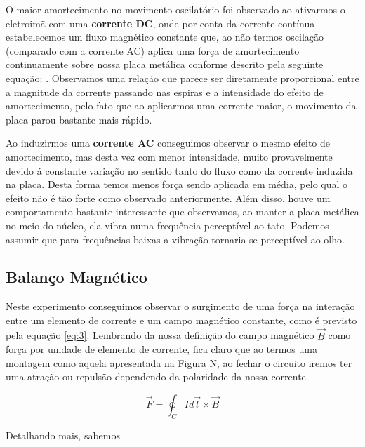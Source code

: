 \documentclass[12pt, a4paper, notitlepage]{article}
\begin{document}
        O maior amortecimento no movimento oscilatório foi observado ao ativarmos o eletroimã com uma \textbf{corrente DC}, onde por conta da corrente contínua estabelecemos um fluxo magnético constante que, ao não termos oscilação (comparado com a corrente AC) aplica uma força de amortecimento continuamente sobre nossa placa metálica conforme descrito pela seguinte equação: . Observamos uma relação que parece ser diretamente proporcional entre a magnitude da corrente passando nas espiras e a intensidade do efeito de amortecimento, pelo fato que ao aplicarmos uma corrente maior, o movimento da placa parou bastante mais rápido.
        
        Ao induzirmos uma \textbf{corrente AC} conseguimos observar o mesmo efeito de amortecimento, mas desta vez com menor intensidade, muito provavelmente devido á constante variação no sentido tanto do fluxo como da corrente induzida na placa. Desta forma temos menos força sendo aplicada em média, pelo qual o efeito não é tão forte como observado anteriormente. Além disso, houve um comportamento bastante interessante que observamos, ao manter a placa metálica no meio do núcleo, ela vibra numa frequência perceptível ao tato. Podemos assumir que para frequências baixas a vibração tornaria-se perceptível ao olho.
        
        \subsection{Balanço Magnético}
        
        Neste experimento conseguimos observar o surgimento de uma força na interação entre um elemento de corrente e um campo magnético constante, como é previsto pela equação \ref{eq:3}. Lembrando da nossa definição do campo magnético $\vec{B}$ como força por unidade de elemento de corrente, fica claro que ao termos uma montagem como aquela apresentada na Figura N, ao fechar o circuito iremos ter uma atração ou repulsão dependendo da polaridade da nossa corrente.
        
        
        \begin{equation}\label{eq:3}
            \vec{F} = \oint_{C}Id\vec{l}\times\vec{B}
        \end{equation}
        
        Detalhando mais, sabemos 
        
        
\end{document}
